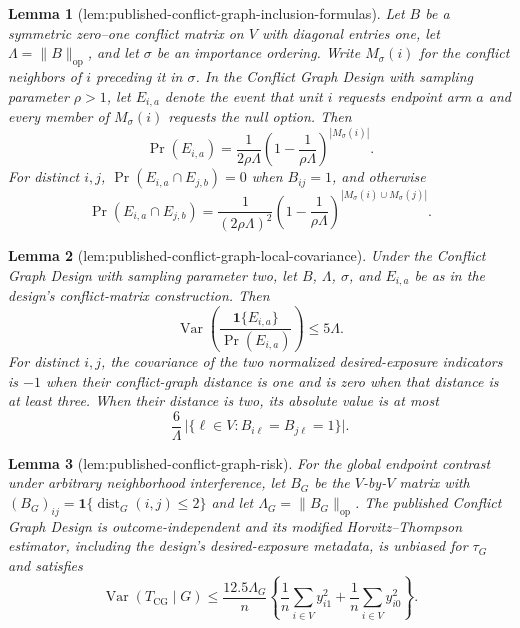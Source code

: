 \documentclass{article}
\newtheorem{lemma}{Lemma}
\begin{document}
\begin{lemma}[lem:published-conflict-graph-inclusion-formulas]\label{lem:published-conflict-graph-inclusion-formulas}
Let \(B\) be a symmetric zero--one conflict matrix on \(V\) with diagonal entries one, let \(\Lambda=\|B\|_{\mathrm{op}}\), and let \(\sigma\) be an importance ordering.  Write \(M_\sigma(i)\) for the conflict neighbors of \(i\) preceding it in \(\sigma\).  In the Conflict Graph Design with sampling parameter \(\rho>1\), let \(E_{i,a}\) denote the event that unit \(i\) requests endpoint arm \(a\) and every member of \(M_\sigma(i)\) requests the null option.  Then
\[
\Pr(E_{i,a})=\frac{1}{2\rho\Lambda}
\left(1-\frac{1}{\rho\Lambda}\right)^{|M_\sigma(i)|}.
\]
For distinct \(i,j\), \(\Pr(E_{i,a}\cap E_{j,b})=0\) when \(B_{ij}=1\), and otherwise
\[
\Pr(E_{i,a}\cap E_{j,b})=\frac{1}{(2\rho\Lambda)^2}
\left(1-\frac{1}{\rho\Lambda}\right)^{|M_\sigma(i)\cup M_\sigma(j)|}.
\]
\end{lemma}

\begin{lemma}[lem:published-conflict-graph-local-covariance]\label{lem:published-conflict-graph-local-covariance}
Under the Conflict Graph Design with sampling parameter two, let \(B\), \(\Lambda\), \(\sigma\), and \(E_{i,a}\) be as in the design's conflict-matrix construction.  Then
\[
\operatorname{Var}\!\left(\frac{\mathbf 1\{E_{i,a}\}}{\Pr(E_{i,a})}\right)\le5\Lambda.
\]
For distinct \(i,j\), the covariance of the two normalized desired-exposure indicators is \(-1\) when their conflict-graph distance is one and is zero when that distance is at least three.  When their distance is two, its absolute value is at most
\[
\frac{6}{\Lambda}\,
\bigl|\{\ell\in V:B_{i\ell}=B_{j\ell}=1\}\bigr|.
\]
\end{lemma}

\begin{lemma}[lem:published-conflict-graph-risk]\label{lem:published-conflict-graph-risk}
For the global endpoint contrast under arbitrary neighborhood interference, let \(B_G\) be the \(V\)-by-\(V\) matrix with \((B_G)_{ij}=\mathbf 1\{\operatorname{dist}_G(i,j)\le2\}\) and let \(\Lambda_G=\|B_G\|_{\mathrm{op}}\).  The published Conflict Graph Design is outcome-independent and its modified Horvitz--Thompson estimator, including the design's desired-exposure metadata, is unbiased for \(\tau_G\) and satisfies
\[
\operatorname{Var}(T_{\mathrm{CG}}\mid G)
\le \frac{12.5\Lambda_G}{n}
\left\{\frac1n\sum_{i\in V}y_{i1}^2+
\frac1n\sum_{i\in V}y_{i0}^2\right\}.
\]
\end{lemma}
\end{document}

